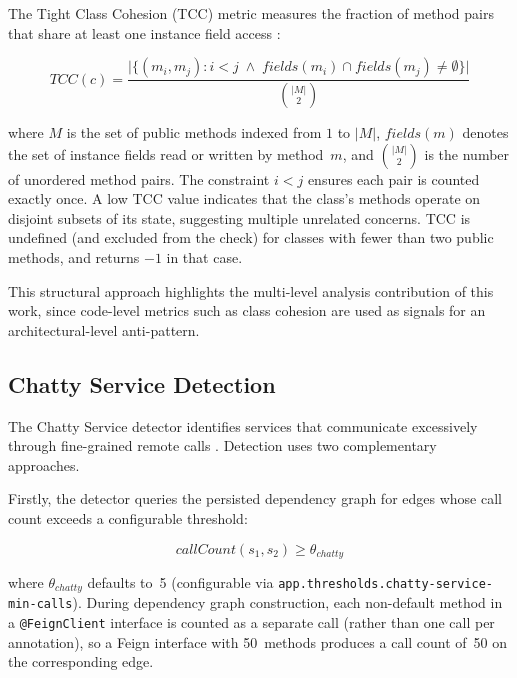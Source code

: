 The Tight Class Cohesion (TCC) metric measures the fraction of method pairs that share at least one instance field access \cite{Bieman1995}:

\begin{equation}
    \mathit{TCC}(c) = \frac{\bigl|\{(m_i, m_j) : i < j \;\wedge\; \mathit{fields}(m_i) \cap \mathit{fields}(m_j) \neq \emptyset\}\bigr|}{{\binom{|M|}{2}}}
    \label{eq:tcc}
\end{equation}

\noindent where $M$ is the set of public methods indexed from $1$ to $|M|$, $\mathit{fields}(m)$ denotes the set of instance fields read or written by method~$m$, and $\binom{|M|}{2}$ is the number of unordered method pairs. The constraint $i < j$ ensures each pair is counted exactly once. A low TCC value indicates that the class's methods operate on disjoint subsets of its state, suggesting multiple unrelated concerns. TCC is undefined (and excluded from the check) for classes with fewer than two public methods, and returns $-1$ in that case.

This structural approach highlights the multi-level analysis contribution of this work, since code-level metrics such as class cohesion are used as signals for an architectural-level anti-pattern.

\subsection{Chatty Service Detection}
\label{subsec:detect-chatty-service}

\par The Chatty Service detector identifies services that communicate excessively through fine-grained remote calls \cite{Taibi2018, Richardson2018, AzureChattyIO}. Detection uses two complementary approaches.

Firstly, the detector queries the persisted dependency graph for edges whose call count exceeds a configurable threshold:

\begin{equation}
    \mathit{callCount}(s_1, s_2) \geq \theta_{\mathit{chatty}}
    \label{eq:chatty-service-detection}
\end{equation}

\noindent where $\theta_{\mathit{chatty}}$ defaults to~5 (configurable via \texttt{app.\-thres\-holds.\-cha\-tty-ser\-vice\--min\--calls}). During dependency graph construction, each non-default method in a \texttt{@FeignClient} interface is counted as a separate call (rather than one call per annotation), so a Feign interface with 50~methods produces a call count of~50 on the corresponding edge.

